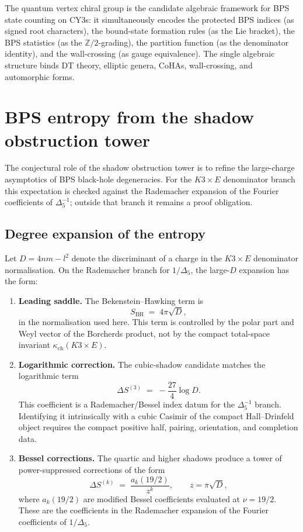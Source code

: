 \documentclass[11pt]{article}
\theoremstyle{definition}
\newcommand{\bZ}{\mathbb{Z}}
\newcommand{\kch}{\kappa_{\mathrm{ch}}}
\begin{document}
The quantum vertex chiral group is the candidate algebraic framework
for BPS state counting on CY3s: it simultaneously encodes the protected
BPS indices (as signed root characters), the bound-state formation rules (as the Lie bracket),
the BPS statistics (as the $\bZ/2$-grading), the partition function
(as the denominator identity), and the wall-crossing (as gauge
equivalence). The single algebraic structure binds DT theory, elliptic
genera, CoHAs, wall-crossing, and automorphic forms.

\section{BPS entropy from the shadow obstruction tower}
\label{sec:bps-entropy}

The conjectural role of the shadow obstruction tower is to refine the large-charge
asymptotics of BPS black-hole degeneracies. For the $K3\times E$
denominator branch this expectation is checked against the Rademacher
expansion of the Fourier coefficients of $\Delta_5^{-1}$; outside that
branch it remains a proof obligation.

\subsection{Degree expansion of the entropy}

Let $D = 4nm - l^2$ denote the discriminant of a charge in the
$K3\times E$ denominator normalisation. On the Rademacher branch for
$1/\Delta_5$, the large-$D$ expansion has the form:

\begin{enumerate}[label=(\roman*)]
 \item \textbf{Leading saddle.}
 The Bekenstein--Hawking term is
 \[
 S_{\mathrm{BH}} \;=\; 4\pi \sqrt{D},
 \]
 in the normalisation used here. This term is controlled by the
 polar part and Weyl vector of the Borcherds product, not by the
 compact total-space invariant $\kch(K3\times E)$.

 \item \textbf{Logarithmic correction.}
 The cubic-shadow candidate matches the logarithmic term
 \[
 \Delta S^{(3)} \;=\; -\frac{27}{4} \log D.
 \]
 This coefficient is a Rademacher/Bessel index datum for the
 $\Delta_5^{-1}$ branch. Identifying it intrinsically with a cubic
 Casimir of the compact Hall--Drinfeld object requires the compact
 positive half, pairing, orientation, and completion data.

 \item \textbf{Bessel corrections.}
 The quartic and higher shadows produce a tower of
 power-suppressed corrections of the form
 \[
 \Delta S^{(k)} \;=\; \frac{a_k(19/2)}{z^k},
 \qquad z = \pi\sqrt{D},
 \]
 where $a_k(19/2)$ are modified Bessel coefficients evaluated at
 $\nu = 19/2$. These are the coefficients in the Rademacher expansion
 of the Fourier coefficients of $1/\Delta_5$.
\end{enumerate}
\end{document}
